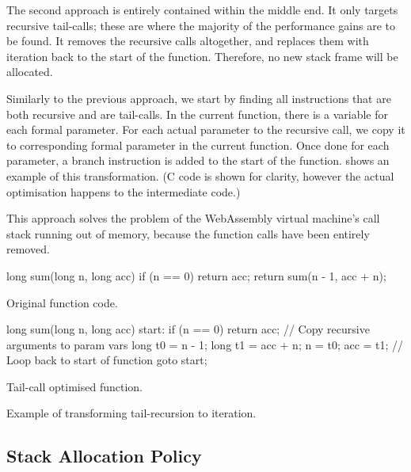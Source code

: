 \documentclass[00-main.tex]{subfiles}
\begin{document}
The second approach is entirely contained within the middle end.
It only targets recursive tail-calls; these are where the majority of the performance gains are to be found.
It removes the recursive calls altogether, and replaces them with iteration back to the start of the function.
Therefore, no new stack frame will be allocated.

Similarly to the previous approach, we start by finding all  instructions that are both recursive and are tail-calls.
In the current function, there is a variable for each formal parameter.
For each actual parameter to the recursive call, we copy it to corresponding formal parameter in the current function.
Once done for each parameter, a branch instruction is added to the start of the function.
 shows an example of this transformation.
(C code is shown for clarity, however the actual optimisation happens to the intermediate code.)

This approach solves the problem of the WebAssembly virtual machine's call stack running out of memory, because the function calls have been entirely removed.

\begin{listing}[t]
  \begin{sublisting}[b]{0.49\textwidth}
    \begin{CListing}
      long sum(long n, long acc) {
          if (n == 0) {
              return acc;
          }
          return sum(n - 1, acc + n);
      }
    \end{CListing}
    \caption{Original function code.}
  \end{sublisting}
  \hfill
  \begin{sublisting}[b]{0.49\textwidth}
    \begin{CListing}
      long sum(long n, long acc) {
      start:
          if (n == 0) {
              return acc;
          }
          // Copy recursive arguments to param vars
          long t0 = n - 1;
          long t1 = acc + n;
          n = t0;
          acc = t1;
          // Loop back to start of function
          goto start;
      }
    \end{CListing}
    \caption{Tail-call optimised function.}
  \end{sublisting}
  \caption{Example of transforming tail-recursion to iteration.}
  \label{lst:tail-call optimisation example}
\end{listing}


\subsection{Stack Allocation Policy}\label{sec:impl:optimised stack allocation}
\end{document}

